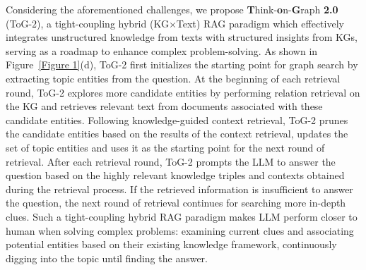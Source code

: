 \documentclass{article} %
\begin{document}
Considering the aforementioned challenges, we propose \textbf{T}hink-\textbf{o}n-\textbf{G}raph \textbf{2.0} (ToG-$2$), a tight-coupling hybrid (KG$\times$Text) RAG paradigm which effectively integrates unstructured knowledge from texts with structured insights from KGs, serving as a roadmap to enhance complex problem-solving.
As shown in Figure~\ref{Figure 1}(d), ToG-2 first initializes the starting point for graph search by extracting topic entities from the question. At the beginning of each retrieval round, ToG-2 explores more candidate entities by performing relation retrieval on the KG and retrieves relevant text from documents associated with these candidate entities. Following knowledge-guided context retrieval, ToG-2 prunes the candidate entities based on the results of the context retrieval, updates the set of topic entities and uses it as the starting point for the next round of retrieval. After each retrieval round, ToG-2 prompts the LLM to answer the question based on the highly relevant knowledge triples and contexts obtained during the retrieval process. If the retrieved information is insufficient to answer the question, the next round of retrieval continues for searching more in-depth clues. Such a tight-coupling hybrid RAG paradigm makes LLM perform closer to human when solving complex problems: examining current clues and associating potential entities based on their existing knowledge framework, continuously digging into the topic until finding the answer.
\end{document}
